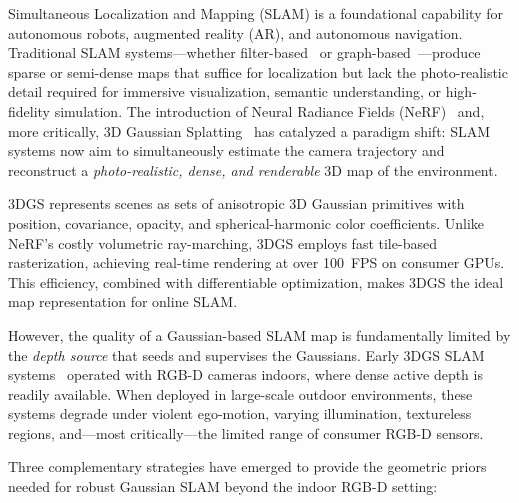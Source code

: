 Simultaneous Localization and Mapping (SLAM) is a foundational capability
for autonomous robots, augmented reality (AR), and autonomous navigation.
Traditional SLAM systems---whether filter-based~\cite{qin2018vinsmono,
xu2022fastlio2} or graph-based~\cite{campos2021orbslam3}---produce sparse
or semi-dense maps that suffice for localization but lack the photo-realistic
detail required for immersive visualization, semantic understanding, or
high-fidelity simulation.  The introduction of Neural Radiance Fields
(NeRF)~\cite{mildenhall2020nerf} and, more critically, 3D Gaussian
Splatting~\cite{kerbl2023_3dgs} has catalyzed a paradigm shift: SLAM systems
now aim to simultaneously estimate the camera trajectory and reconstruct a
\emph{photo-realistic, dense, and renderable} 3D map of the environment.

3DGS represents scenes as sets of anisotropic 3D Gaussian primitives with
position, covariance, opacity, and spherical-harmonic color coefficients.
Unlike NeRF's costly volumetric ray-marching, 3DGS employs fast
tile-based rasterization, achieving real-time rendering at over 100~FPS on
consumer GPUs.  This efficiency, combined with differentiable optimization,
makes 3DGS the ideal map representation for online SLAM.

However, the quality of a Gaussian-based SLAM map is fundamentally limited by
the \emph{depth source} that seeds and supervises the Gaussians.  Early 3DGS
SLAM systems~\cite{yan2024gsslam,keetha2024_splatam,matsuki2024monogs}
operated with RGB-D cameras indoors, where dense active depth is readily
available.  When deployed in large-scale outdoor environments, these systems
degrade under violent ego-motion, varying illumination, textureless regions,
and---most critically---the limited range of consumer RGB-D sensors.

Three complementary strategies have emerged to provide the geometric priors
needed for robust Gaussian SLAM beyond the indoor RGB-D setting:

